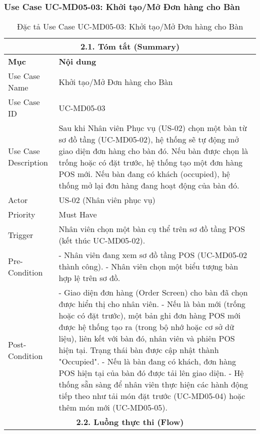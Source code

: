 \subsubsection{Use Case UC-MD05-03: Khởi tạo/Mở Đơn hàng cho Bàn}
\begin{longtable}{|m{4cm}|p{11cm}|}
\caption{Đặc tả Use Case UC-MD05-03: Khởi tạo/Mở Đơn hàng cho Bàn} \label{tab:uc_md05_03_final} \\
\hline
\multicolumn{2}{|c|}{\textbf{2.1. Tóm tắt (Summary)}} \\
\hline
\textbf{Mục} & \textbf{Nội dung} \\
\hline
\endhead %
\hline
\endfoot %
\hline
\endlastfoot %
Use Case Name & Khởi tạo/Mở Đơn hàng cho Bàn \\
\hline
Use Case ID & UC-MD05-03 \\
\hline
Use Case Description & Sau khi Nhân viên Phục vụ (US-02) chọn một bàn từ sơ đồ tầng (UC-MD05-02), hệ thống sẽ tự động mở giao diện đơn hàng cho bàn đó. Nếu bàn được chọn là trống hoặc có đặt trước, hệ thống tạo một đơn hàng POS mới. Nếu bàn đang có khách (occupied), hệ thống mở lại đơn hàng đang hoạt động của bàn đó. \\
\hline
Actor & US-02 (Nhân viên phục vụ) \\
\hline
Priority & Must Have \\
\hline
Trigger & Nhân viên chọn một bàn cụ thể trên sơ đồ tầng POS (kết thúc UC-MD05-02). \\
\hline
Pre-Condition & - Nhân viên đang xem sơ đồ tầng POS (UC-MD05-02 thành công). \newline - Nhân viên chọn một biểu tượng bàn hợp lệ trên sơ đồ. \\
\hline
Post-Condition & - Giao diện đơn hàng (Order Screen) cho bàn đã chọn được hiển thị cho nhân viên. \newline - Nếu là bàn mới (trống hoặc có đặt trước), một bản ghi đơn hàng POS mới được hệ thống tạo ra (trong bộ nhớ hoặc cơ sở dữ liệu), liên kết với bàn đó, nhân viên và phiên POS hiện tại. Trạng thái bàn được cập nhật thành "Occupied". \newline - Nếu là bàn đang có khách, đơn hàng POS hiện tại của bàn đó được tải lên giao diện. \newline - Hệ thống sẵn sàng để nhân viên thực hiện các hành động tiếp theo như tải món đặt trước (UC-MD05-04) hoặc thêm món mới (UC-MD05-05). \\
\hline
\multicolumn{2}{|c|}{\textbf{2.2. Luồng thực thi (Flow)}} \\

\end{longtable}
